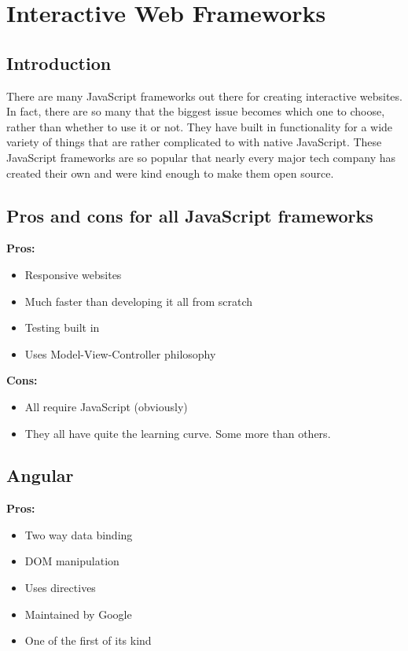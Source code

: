 \documentclass[draftclsnofoot,onecolumn,letterpaper,10pt,compsoc]{IEEEtran}
\begin{document}
\section{Interactive Web Frameworks}
  \subsection{Introduction}

  There are many JavaScript frameworks out there for creating interactive websites.
  In fact, there are so many that the biggest issue becomes which one to choose, rather than whether to use it or not.
  They have built in functionality for a wide variety of things that are rather complicated to with native JavaScript.
  These JavaScript frameworks are so popular that nearly every major tech company has created their own and were kind enough to make them open source.


  \subsection{Pros and cons for all JavaScript frameworks}
    \textbf{Pros:}
    \begin{itemize}
      \item Responsive websites
      \item Much faster than developing it all from scratch
      \item Testing built in
      \item Uses Model-View-Controller philosophy
    \end{itemize}

    \textbf{Cons:}
    \begin{itemize}
      \item All require JavaScript (obviously)
      \item They all have quite the learning curve. Some more than others.
    \end{itemize}

	\subsection{Angular}

  \textbf{Pros:}
    \begin{itemize}
      \item Two way data binding
      \item DOM manipulation
      \item Uses directives
      \item Maintained by Google
      \item One of the first of its kind
    \end{itemize}
\end{document}
